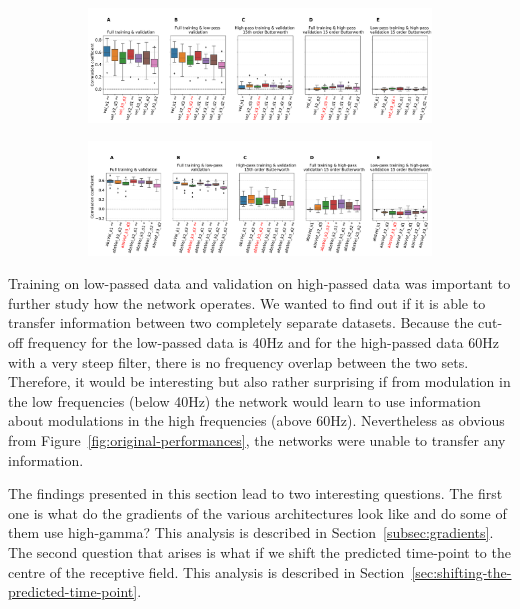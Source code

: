 \begin{itemize}
\begin{figure}[!htpb]
\centering
\begin{subfigure}[b]{\textwidth}
   \includegraphics[width=1\linewidth]{img/ch4/original_setting_vel_performance_comparison}
   \caption{}
   \label{fig:original-performances-velocity} 
\end{subfigure}

\begin{subfigure}[b]{\textwidth}
   \includegraphics[width=1\linewidth]{img/ch4/original_setting_absVel_performance_comparison}
   \caption{}
   \label{fig:original-performances-absolute-velocity}
\end{subfigure}
\caption[]{}
\end{figure}\label{fig:original-performances}

Training on low-passed data and validation on high-passed data was important to further study how the network operates.
We wanted to find out if it is able to transfer information between two completely separate datasets.
Because the cut-off frequency for the low-passed data is 40Hz and for the high-passed data 60Hz with a very steep filter, there is no frequency overlap between the two sets.
Therefore, it would be interesting but also rather surprising if from modulation in the low frequencies (below 40Hz) the network would learn to use information about modulations in the high frequencies (above 60Hz).
Nevertheless as obvious from Figure~\ref{fig:original-performances}, the networks were unable to transfer any information.
\end{itemize}
The findings presented in this section lead to two interesting questions.
The first one  is what do the gradients of the various architectures look like and do some of them use high-gamma?
This analysis is described in Section~\ref{subsec:gradients}.
The second question that arises is what if  we shift the predicted time-point to the centre of the receptive field.
This analysis is described in Section~\ref{sec:shifting-the-predicted-time-point}.

